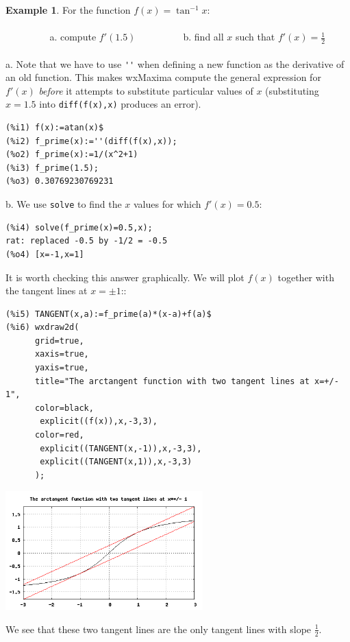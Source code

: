 \documentclass[10.5pt,twoside]{report}
\theoremstyle{definition}
\newtheorem{exmp}{Example}[section]
\begin{document}
\begin{exmp}  For the function $f(x)=\tan^{-1}{x}$: \\
${}$   \\
\verb|         |a. compute $f'(1.5)$
\verb|         |b. find all $x$ such that $f'(x)=\frac{1}{2}$\\
${}$\\

a.  Note that we have to use \verb|''| when defining a new function as the derivative of an old function.  This makes wxMaxima compute the general expression for $f'(x)$ \textit{before} it attempts to substitute particular values of $x$ (substituting $x=1.5$ into \verb|diff(f(x),x)| produces an error).

\begin{verbatim}
(%i1) f(x):=atan(x)$
(%i2) f_prime(x):=''(diff(f(x),x));
(%o2) f_prime(x):=1/(x^2+1)
(%i3) f_prime(1.5);
(%o3) 0.30769230769231
\end{verbatim}

b.  We use \verb|solve| to find the $x$ values for which $f'(x)=0.5$:

\begin{verbatim}
(%i4) solve(f_prime(x)=0.5,x);
rat: replaced -0.5 by -1/2 = -0.5
(%o4) [x=-1,x=1]
\end{verbatim} 

It is worth checking this answer graphically.  We will plot $f(x)$ together with the tangent lines at $x=\pm 1$::

\begin{verbatim}
(%i5) TANGENT(x,a):=f_prime(a)*(x-a)+f(a)$
(%i6) wxdraw2d(
      grid=true,
      xaxis=true,
      yaxis=true,
      title="The arctangent function with two tangent lines at x=+/- 1",
      color=black,
       explicit((f(x)),x,-3,3),
      color=red,
       explicit((TANGENT(x,-1)),x,-3,3),
       explicit((TANGENT(x,1)),x,-3,3)
      );
\end{verbatim}


\includegraphics[width=3in]{example_4_2_1}

We see that these two tangent lines are the only tangent lines with slope $\frac{1}{2}$.


\end{exmp}
\end{document}
